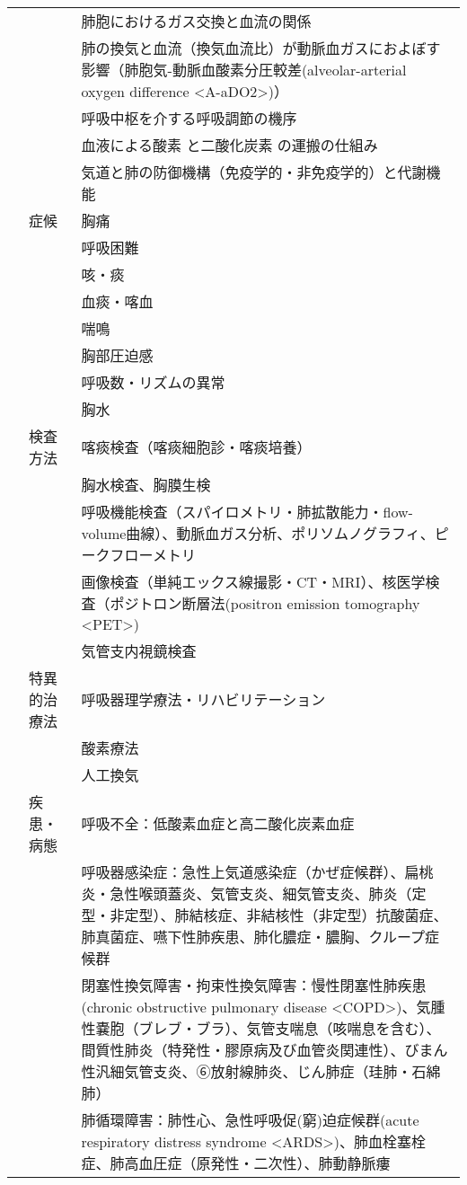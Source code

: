 \begin{xltabular}{\linewidth}{XXX}
 &  & 肺胞におけるガス交換と血流の関係 \\
 &  & 肺の換気と血流（換気血流比）が動脈血ガスにおよぼす影響（肺胞気-動脈血酸素分圧較差(alveolar-arterial oxygen difference <A-aDO2>)） \\
 &  & 呼吸中枢を介する呼吸調節の機序 \\
 &  & 血液による酸素 と二酸化炭素 の運搬の仕組み \\
 &  & 気道と肺の防御機構（免疫学的・非免疫学的）と代謝機能 \\
 & 症候 & 胸痛 \\
 &  & 呼吸困難 \\
 &  & 咳・痰 \\
 &  & 血痰・喀血 \\
 &  & 喘鳴 \\
 &  & 胸部圧迫感 \\
 &  & 呼吸数・リズムの異常 \\
 &  & 胸水 \\
 & 検査方法 & 喀痰検査（喀痰細胞診・喀痰培養） \\
 &  & 胸水検査、胸膜生検 \\
 &  & 呼吸機能検査（スパイロメトリ・肺拡散能力・flow-volume曲線）、動脈血ガス分析、ポリソムノグラフィ、ピークフローメトリ \\
 &  & 画像検査（単純エックス線撮影・CT・MRI）、核医学検査（ポジトロン断層法(positron emission tomography <PET>) \\
 &  & 気管支内視鏡検査 \\
 & 特異的治療法 & 呼吸器理学療法・リハビリテーション \\
 &  & 酸素療法 \\
 &  & 人工換気 \\
 & 疾患・病態 & 呼吸不全：低酸素血症と高二酸化炭素血症 \\
 &  & 呼吸器感染症：急性上気道感染症（かぜ症候群）、扁桃炎・急性喉頭蓋炎、気管支炎、細気管支炎、肺炎（定型・非定型）、肺結核症、非結核性（非定型）抗酸菌症、肺真菌症、嚥下性肺疾患、肺化膿症・膿胸、クループ症候群 \\
 &  & 閉塞性換気障害・拘束性換気障害：慢性閉塞性肺疾患(chronic obstructive pulmonary disease <COPD>)、気腫性嚢胞（ブレブ・ブラ）、気管支喘息（咳喘息を含む）、間質性肺炎（特発性・膠原病及び血管炎関連性）、びまん性汎細気管支炎、➅放射線肺炎、じん肺症（珪肺・石綿肺） \\
 &  & 肺循環障害：肺性心、急性呼吸促(窮)迫症候群(acute respiratory distress syndrome <ARDS>)、肺血栓塞栓症、肺高血圧症（原発性・二次性）、肺動静脈瘻 \\

\end{xltabular}
